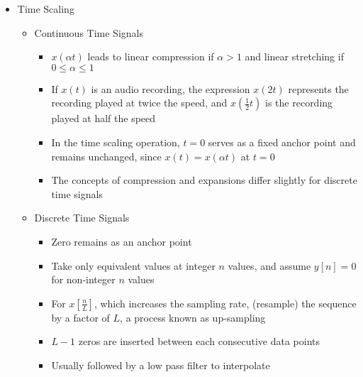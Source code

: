 \begin{itemize}
\begin{itemize}
    \end{itemize}

  \item Time Scaling

    \begin{itemize}

      \item Continuous Time Signals

        \begin{itemize}

          \item $x(\alpha t)$ leads to linear compression if $\alpha>1$ and linear stretching if $0\leq \alpha\leq 1$

          \item If $x(t)$ is an audio recording, the expression $x(2t)$ represents the recording played at twice the speed, and $x\left( \frac{1}{2}t \right)$ is the recording played at half the speed

          \item In the time scaling operation, $t=0$ serves as a fixed anchor point and remains unchanged, since $x(t)=x(\alpha t)$ at $t=0$

          \item The concepts of compression and expansions differ slightly for discrete time signals

        \end{itemize}

      \item Discrete Time Signals

        \begin{itemize}

          \item Zero remains as an anchor point

          \item Take only equivalent values at integer $n$ values, and assume $y[n]=0$ for non-integer $n$ values

          \item For $x\left[ \frac{n}{L} \right]$, which increases the sampling rate, (resample) the sequence by a factor of $L$, a process known as up-sampling

          \item $L-1$ zeros are inserted between each consecutive data points

          \item Usually followed by a low pass filter to interpolate


\end{itemize}
\end{itemize}
\end{itemize}
